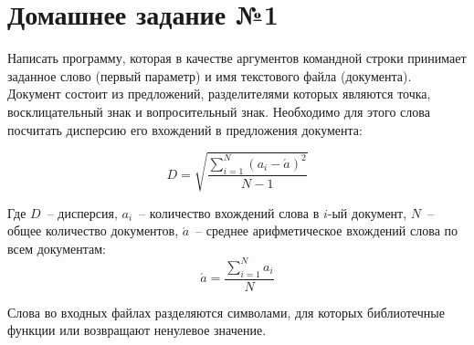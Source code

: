 \section*{Домашнее задание №1}

Написать программу, которая в качестве аргументов командной строки
принимает заданное слово (первый параметр) и имя текстового файла
(документа). Документ состоит из предложений, разделителями которых
являются точка, восклицательный знак и вопросительный знак.
Необходимо для этого слова посчитать дисперсию его вхождений в
предложения документа:

$$
	D=\sqrt{ \frac{ \sum^N_{i = 1}{ (a_i-\acute{a})^2 } }{ N - 1 } }
$$

Где $D$~-- дисперсия, $a_i$~-- количество вхождений слова в $i$-ый документ, $N$~-- общее количество документов,
$\acute{a}$~-- среднее арифметическое вхождений слова по всем документам:
$$
	\acute{a} = \frac{ \sum^N_{i=1}{a_i} }{N}
$$

Слова во входных файлах разделяются символами, для которых
библиотечные функции  или  возвращают ненулевое
значение.

